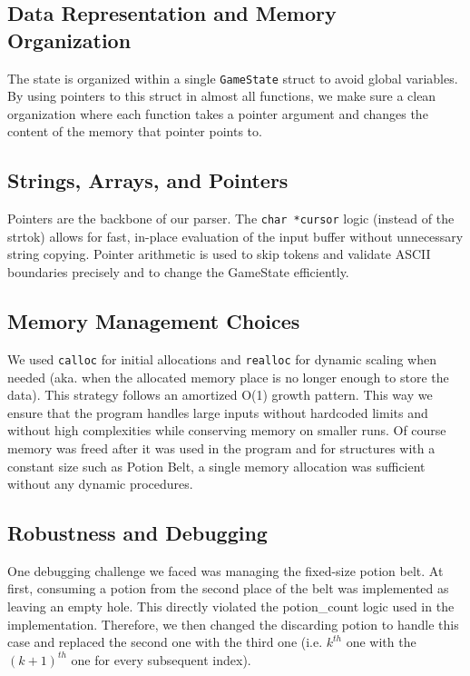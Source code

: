 \documentclass[a4paper,12pt]{article}
\begin{document}
\subsection{Data Representation and Memory Organization}

The state is organized within a single \texttt{GameState} struct to avoid global variables. By using pointers to this struct in almost all functions, we make sure a clean organization where each function takes a pointer argument and changes the content of the memory that pointer points to.

\subsection{Strings, Arrays, and Pointers}

Pointers are the backbone of our parser. The \texttt{char *cursor} logic (instead of the strtok) allows for fast, in-place evaluation of the input buffer without unnecessary string copying. Pointer arithmetic is used to skip tokens and validate ASCII boundaries precisely and to change the GameState efficiently.

\subsection{Memory Management Choices}

We used \texttt{calloc} for initial allocations and \texttt{realloc} for dynamic scaling when needed (aka. when the allocated memory place is no longer enough to store the data). This strategy follows an amortized O(1) growth pattern. This way we ensure that the program handles large inputs without hardcoded limits and without high complexities while conserving memory on smaller runs. Of course memory was freed after it was used in the program and for structures with a constant size such as Potion Belt, a single memory allocation was sufficient without any dynamic procedures.

\subsection{Robustness and Debugging}

One debugging challenge we faced was managing the fixed-size potion belt. At first, consuming a potion from the second place of the belt was implemented as leaving an empty hole. This directly violated the potion\_count logic used in the implementation. Therefore, we then changed the discarding potion to handle this case and replaced the second one with the third one (i.e. $k^{th}$ one with the $(k+1)^{th}$ one for every subsequent index).
\end{document}
